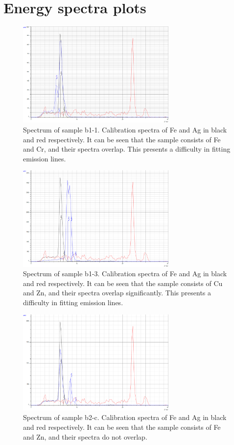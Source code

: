 \documentclass[11pt,a4paper,twoside,onecolumn]{article}
\begin{document}
\section{Energy spectra plots}
\begin{figure}[!htbp]
    \centering
    \includegraphics[width=0.7\textwidth]{img/spect-b1-1.png}
    \caption{Spectrum of sample b1-1. Calibration spectra of Fe and Ag in black and red respectively. It can be seen that the sample consists of Fe and Cr, and their spectra overlap. This presents a difficulty in fitting emission lines.}
    \label{fig:spect-b1-1}
\end{figure}
\begin{figure}[!htbp]
    \centering
    \includegraphics[width=0.7\textwidth]{img/spect-b1-3.png}
    \caption{Spectrum of sample b1-3. Calibration spectra of Fe and Ag in black and red respectively. It can be seen that the sample consists of Cu and Zn, and their spectra overlap significantly. This presents a difficulty in fitting emission lines.}
    \label{fig:spect-b1-3}
\end{figure}
\begin{figure}[!htbp]
    \centering
    \includegraphics[width=0.7\textwidth]{img/spect-b2-c.png}
    \caption{Spectrum of sample b2-c. Calibration spectra of Fe and Ag in black and red respectively. It can be seen that the sample consists of Fe and Zn, and their spectra do not overlap.}
    \label{fig:spect-b2-c}
\end{figure}
\end{document}
